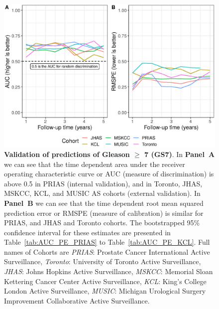 \begin{figure}
\centerline{\includegraphics[width=\columnwidth]{images/auc_pe.eps}}
\caption{\textbf{Validation of predictions of Gleason $\geq$ 7 (GS7)}. In \textbf{Panel~A} we can see that the time dependent area under the receiver operating characteristic curve or AUC (measure of discrimination) is above 0.5 in PRIAS (internal validation), and in Toronto, JHAS, MSKCC, KCL, and MUSIC AS cohorts (external validation). In \textbf{Panel~B} we can see that the time dependent root mean squared prediction error or RMSPE (measure of calibration) is similar for PRIAS, and JHAS and Toronto cohorts. The bootstrapped 95\% confidence interval for these estimates are presented in Table~\ref{tab:AUC_PE_PRIAS} to Table~\ref{tab:AUC_PE_KCL}. Full names of Cohorts are \textit{PRIAS}: Prostate Cancer International Active Surveillance, \textit{Toronto}: University of Toronto Active Surveillance, \textit{JHAS}: Johns Hopkins Active Surveillance, \textit{MSKCC}: Memorial Sloan Kettering Cancer Center Active Surveillance, \textit{KCL}: King's College London Active Surveillance, \textit{MUSIC}: Michigan Urological Surgery Improvement Collaborative Active Surveillance.}
\label{fig:auc_pe}
\end{figure}

